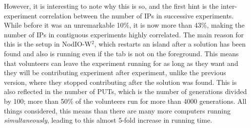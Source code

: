 \documentclass[journal,onecolumn]{IEEEtran}
\begin{document}
However, it is interesting to note why this is so, and the first hint
is the inter-experiment correlation between the number of IPs in
successive experiments. While before it was an unremarkable 10\%, it is
now more than 43\%, making the number of IPs in contiguous experiments
highly correlated. The main reason for this is the setup in {\sf
  NodIO-W$^2$}, which restarts an island after a solution has been
found and also is running even if the tab is not on the
foreground. This means that volunteers can leave the experiment
running for as long as they want and they will be contributing 
experiment after experiment, unlike the previous version, where they
stopped contributing after the solution was found. This is also
reflected in the number of PUTs, which is the number of generations
divided by 100; more than 50\% of the volunteers run for more than
4000 generations. All things considered, this means than there are
many more computers running {\em simultaneously}, leading to this
almost 5-fold increase in running time.
\end{document}
